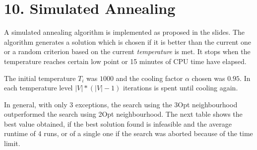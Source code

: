 \section*{10. Simulated Annealing}
A simulated annealing algorithm  is implemented as proposed in the slides. The algorithm generates a solution which is chosen if it is better than the current one or a random criterion based on the current \textit{temperature} is met. It stops when the temperature reaches certain low point or 15 minutes of CPU time have elapsed.

The initial temperature $ T_i $ was $ 1000 $ and the cooling factor $ \alpha $ chosen was $ 0.95 $. In each temperature level $ |V|*(|V|-1) $ iterations is spent until cooling again.

In general, with only 3 exceptions, the search using the 3Opt neighbourhood outperformed the search using 2Opt neighbourhood. The next table shows the best  value obtained, if the best solution found is infeasible and the average runtime of 4 runs, or of a single one if the search was aborted because of the time limit.

